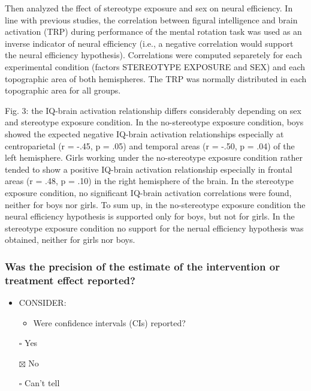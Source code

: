 \documentclass[
  doc, a4paper]{apa7}
\providecommand{\tightlist}{%
  \setlength{\itemsep}{0pt}\setlength{\parskip}{0pt}}
\begin{document}
Then analyzed the ffect of stereotype exposure and sex on neural efficiency. In line with previous studies, the correlation between figural intelligence and brain activation (TRP) during performance of the mental rotation task was used as an inverse indicator of neural efficiency (i.e., a negative correlation would support the neural efficiency hypothesis). Correlations were computed separetely for each experimental condition (factors STEREOTYPE EXPOSURE and SEX) and each topographic area of both hemispheres. The TRP was normally distributed in each topographic area for all groups.

Fig. 3: the IQ-brain activation relationship differs considerably depending on sex and stereotype exposure condition. In the no-stereotype exposure condition, boys showed the expected negative IQ-brain activation relationships especially at centroparietal (r = -.45, p = .05) and temporal areas (r = -.50, p = .04) of the left hemisphere. Girls working under the no-stereotype exposure condition rather tended to show a positive IQ-brain activation relationship especially in frontal areas (r = .48, p = .10) in the right hemisphere of the brain. In the stereotype exposure condition, no significant IQ-brain activation correlations were found, neither for boys nor girls. To sum up, in the no-stereotype exposure condition the neural efficiency hypothesis is supported only for boys, but not for girls. In the stereotype exposure condition no support for the nerual efficiency hypothesis was obtained, neither for girls nor boys.

\subsubsection{Was the precision of the estimate of the intervention or treatment effect reported?}\label{was-the-precision-of-the-estimate-of-the-intervention-or-treatment-effect-reported}

\begin{itemize}
\tightlist
\item
  CONSIDER:

  \begin{itemize}
  \tightlist
  \item
    Were confidence intervals (CIs) reported?
  \end{itemize}
\item[$\square$]
  Yes
\item[$\boxtimes$]
  No
\item[$\square$]
  Can't tell
\end{itemize}
\end{document}
